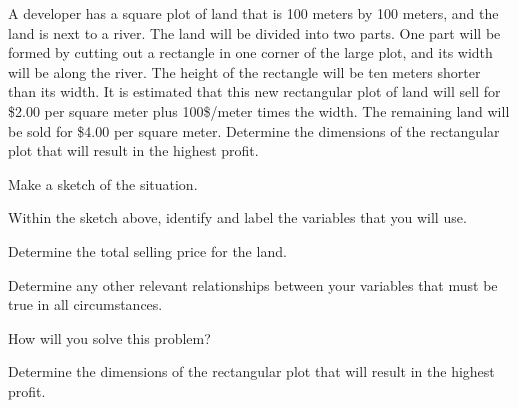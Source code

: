 \begin{problem}
\item A developer has a square plot of land that is 100 meters by 100
  meters, and the land is next to a river. The land will be divided
  into two parts. One part will be formed by cutting out a rectangle
  in one corner of the large plot, and its width will be along the
  river. The height of the rectangle will be ten meters shorter than
  its width. It is estimated that this new rectangular plot of land
  will sell for \$2.00 per square meter plus 100\$/meter times the
  width. The remaining land will be sold for \$4.00 per square meter.
  Determine the dimensions of the rectangular plot that will result in
  the highest profit.
    \begin{subproblem}
      \item Make a sketch of the situation.
        \vfill
      \item Within the sketch above, identify and label the variables
        that you will use.
      \item Determine the total selling price for the land.
        \vfill
      \item Determine any other relevant relationships between your
        variables that must be true in all circumstances.
          \vfill
      \item How will you solve this problem?
        \vfill
      \item Determine the dimensions of the rectangular plot that will
        result in the highest profit.
        \vfill
        \vfill
    \end{subproblem}

\end{problem}

\postClass

